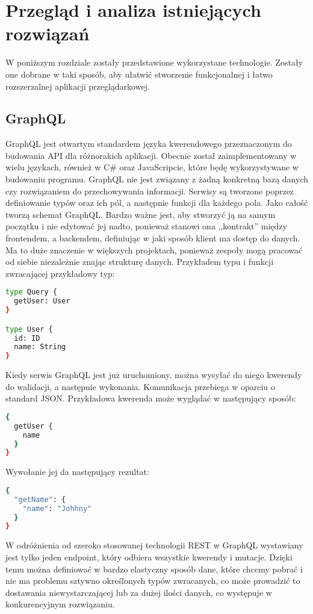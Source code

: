 \chapter{Przegląd i analiza istniejących rozwiązań}
\label{chap:technologies}
W poniższym rozdziale zostały przedstawione wykorzystane technologie. Zostały one dobrane w taki sposób, aby ułatwić stworzenie funkcjonalnej i łatwo rozszerzalnej aplikacji przeglądarkowej.
\section{GraphQL}

GraphQL jest otwartym standardem języka kwerendowego przeznaczonym do budowania API dla różnorakich aplikacji. Obecnie został zaimplementowany w wielu językach\cite{gqlcode}, również w C\# oraz JavaScripcie, które będę wykorzystywane w budowaniu programu. GraphQL nie jest związany z żadną konkretną bazą danych czy rozwiązaniem do przechowywania informacji. Serwisy są tworzone poprzez definiowanie typów oraz ich pól, a następnie funkcji dla każdego pola. Jako całość tworzą schemat GraphQL. Bardzo ważne jest, aby stworzyć ją na samym początku i nie edytować jej nadto, ponieważ stanowi ona ,,kontrakt'' między frontendem, a backendem, definiując w jaki sposób klient ma dostęp do danych. Ma to duże znaczenie w większych projektach, ponieważ zespoły mogą pracować od siebie niezależnie znając strukturę danych. Przykładem typu i funkcji zwracającej przykładowy typ:
\begin{lstlisting}[language=sh]
type Query {
  getUser: User
}

type User {
  id: ID
  name: String
}
\end{lstlisting}
Kiedy serwis GraphQL jest już uruchomiony, można wysyłać do niego kwerendy do walidacji, a następnie wykonania. Komunikacja przebiega w oparciu o standard JSON. Przykładowa kwerenda może wyglądać w następujący sposób:
\begin{lstlisting}[language=sh]
{
  getUser {
    name
  }
}
\end{lstlisting}
Wywołanie jej da następujący rezultat:
\begin{lstlisting}[language=sh]
{
  "getName": {
    "name": "Johhny"
  }
}
\end{lstlisting}
W odróżnienia od szeroko stosowanej technologii REST w GraphQL wystawiany jest tylko jeden endpoint, który odbiera wszystkie kwerendy i mutacje. Dzięki temu można definiować w bardzo elastyczny sposób dane, które chcemy pobrać i nie ma problemu sztywno określonych typów zwracanych, co może prowadzić to dostawania niewystarczającej lub za dużej ilości danych, co występuje w konkurencyjnym rozwiązaniu.

